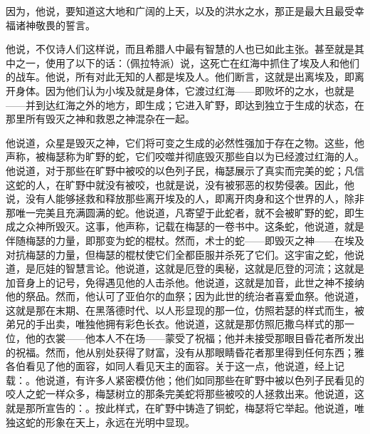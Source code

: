 因为，他说，要知道这大地和广阔的上天，\newline{}以及的洪水之水，那正是\newline{}最大且最受幸福诸神敬畏的誓言。\par

他说，不仅诗人们这样说，而且希腊人中最有智慧的人也已如此主张。甚至就是其中之一，使用了以下的话：（佩拉特派）说，这死亡在红海中抓住了埃及人和他们的战车。他说，所有对此无知的人都是埃及人。他们断言，这就是出离埃及，即离开身体。因为他们认为小埃及就是身体，它渡过红海——即败坏的之水，也就是——并到达红海之外的地方，即生成；它进入旷野，即达到独立于生成的状态，在那里所有毁灭之神和救恩之神混杂在一起。\par

他说道，众星是毁灭之神，它们将可变之生成的必然性强加于存在之物。这些，他声称，被梅瑟称为旷野的蛇，它们咬噬并彻底毁灭那些自以为已经渡过红海的人。他说道，对于那些在旷野中被咬的以色列子民，梅瑟展示了真实而完美的蛇；凡信这蛇的人，在旷野中就没有被咬，也就是说，没有被邪恶的权势侵袭。因此，他说，没有人能够拯救和释放那些离开埃及的人，即离开肉身和这个世界的人，除非那唯一完美且充满圆满的蛇。他说道，凡寄望于此蛇者，就不会被旷野的蛇，即生成之众神所毁灭。这事，他声称，记载在梅瑟的一卷书中。这条蛇，他说道，就是伴随梅瑟的力量，即那变为蛇的棍杖。然而，术士的蛇——即毁灭之神——在埃及对抗梅瑟的力量，但梅瑟的棍杖使它们全都臣服并杀死了它们。这宇宙之蛇，他说道，是厄娃的智慧言论。他说道，这就是厄登的奥秘，这就是厄登的河流；这就是加音身上的记号，免得遇见他的人击杀他。他说道，这就是加音，此世之神不接纳他的祭品。然而，他认可了亚伯尔的血祭；因为此世的统治者喜爱血祭。他说道，这就是那在末期、在黑落德时代、以人形显现的那一位，仿照若瑟的样式而生，被弟兄的手出卖，唯独他拥有彩色长衣。他说道，这就是那仿照厄撒乌样式的那一位，他的衣裳——他本人不在场——蒙受了祝福；他并未接受那眼目昏花者所发出的祝福。然而，他从别处获得了财富，没有从那眼睛昏花者那里得到任何东西；雅各伯看见了他的面容，如同人看见天主的面容。关于这一点，他说道，经上记载：。他说道，有许多人紧密模仿他；他们如同那些在旷野中被以色列子民看见的咬人之蛇一样众多，梅瑟树立的那条完美蛇将那些被咬的人拯救出来。他说道，这就是那所宣告的：。按此样式，在旷野中铸造了铜蛇，梅瑟将它举起。他说道，唯独这蛇的形象在天上，永远在光明中显现。\par

